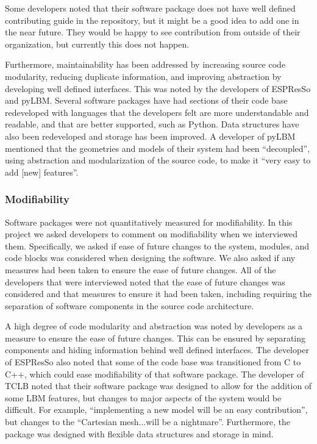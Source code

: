 \documentclass[12pt, notitlepage]{article}
\begin{document}
Some developers noted that their software package does not have well defined contributing guide in the repository, but it might be a good idea to add one in the near future. They would be happy to see contribution from outside of their organization, but currently this does not happen.

Furthermore, maintainability has been addressed by increasing source code modularity, reducing duplicate information, and improving abstraction by developing well defined interfaces. This was noted by the developers of ESPResSo and pyLBM. Several software packages have had sections of their code base redeveloped with languages that the developers felt are more understandable and readable, and that are better supported, such as Python. Data structures have also been redeveloped and storage has been improved. A developer of pyLBM mentioned that the geometries and models of their system had been ``decoupled'', using abstraction and modularization of the source code, to make it ``very easy to add [new] features''.

\subsubsection{Modifiability}

Software packages were not quantitatively measured for modifiability.
In this project we asked developers to comment on modifiability when we interviewed them. Specifically, we asked if ease of future changes to the system, modules, and code blocks was considered when designing the software. We also asked if any measures had been taken to ensure the ease of future changes. 
All of the developers that were interviewed noted that the ease of future changes was considered and that measures to ensure it had been taken, including
requiring the separation of software components in the source code architecture.

A high degree of code modularity and abstraction was noted by developers as a measure to ensure the ease of future changes. This can be ensured by separating components and hiding information behind well defined interfaces. The developer of ESPResSo also noted that some of the code base was transitioned from C to C++, which could ease modifiability of that software package. The developer of TCLB noted that their software package was designed to allow for the addition of some LBM features, but changes to major aspects of the system would be difficult. For example, ``implementing a new model will be an easy contribution'', but changes to the ``Cartesian mesh...will be a nightmare''. Furthermore, the package was designed with flexible data structures and storage in mind. 
\end{document}
